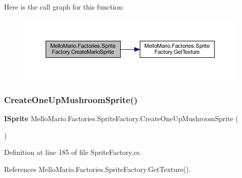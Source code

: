 Here is the call graph for this function\+:
\nopagebreak
\begin{figure}[H]
\begin{center}
\leavevmode
\includegraphics[width=350pt]{classMelloMario_1_1Factories_1_1SpriteFactory_a18d8829d06e8232ca574ab3c6adb5c3f_cgraph}
\end{center}
\end{figure}
\mbox{\label{classMelloMario_1_1Factories_1_1SpriteFactory_a360acc8a347b0c7a3b18e7a52f4ec5de}} 
\subsubsection{Create\+One\+Up\+Mushroom\+Sprite()}
{\footnotesize\ttfamily \textbf{ I\+Sprite} Mello\+Mario.\+Factories.\+Sprite\+Factory.\+Create\+One\+Up\+Mushroom\+Sprite (\begin{DoxyParamCaption}{ }\end{DoxyParamCaption})}



Definition at line 185 of file Sprite\+Factory.\+cs.



References Mello\+Mario.\+Factories.\+Sprite\+Factory.\+Get\+Texture().



